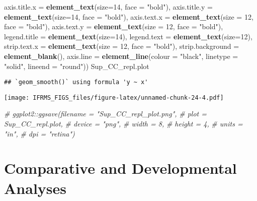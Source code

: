 \documentclass[
]{article}
\newenvironment{Shaded}{\begin{snugshade}}{\end{snugshade}}
\newcommand{\CommentTok}[1]{\textcolor[rgb]{0.56,0.35,0.01}{\textit{#1}}}
\newcommand{\DataTypeTok}[1]{\textcolor[rgb]{0.13,0.29,0.53}{#1}}
\newcommand{\DecValTok}[1]{\textcolor[rgb]{0.00,0.00,0.81}{#1}}
\newcommand{\KeywordTok}[1]{\textcolor[rgb]{0.13,0.29,0.53}{\textbf{#1}}}
\newcommand{\NormalTok}[1]{#1}
\newcommand{\StringTok}[1]{\textcolor[rgb]{0.31,0.60,0.02}{#1}}
\begin{document}
\begin{Shaded}
\begin{Highlighting}[]
        \DataTypeTok{axis.title.x =} \KeywordTok{element_text}\NormalTok{(}\DataTypeTok{size=}\DecValTok{14}\NormalTok{, }\DataTypeTok{face =} \StringTok{"bold"}\NormalTok{),}
        \DataTypeTok{axis.title.y =} \KeywordTok{element_text}\NormalTok{(}\DataTypeTok{size=}\DecValTok{14}\NormalTok{, }\DataTypeTok{face =} \StringTok{"bold"}\NormalTok{),}
        \DataTypeTok{axis.text.x =} \KeywordTok{element_text}\NormalTok{(}\DataTypeTok{size =} \DecValTok{12}\NormalTok{, }\DataTypeTok{face =} \StringTok{"bold"}\NormalTok{),}
        \DataTypeTok{axis.text.y =} \KeywordTok{element_text}\NormalTok{(}\DataTypeTok{size =} \DecValTok{12}\NormalTok{, }\DataTypeTok{face =} \StringTok{"bold"}\NormalTok{),}
        \DataTypeTok{legend.title =} \KeywordTok{element_text}\NormalTok{(}\DataTypeTok{size=}\DecValTok{14}\NormalTok{), }
        \DataTypeTok{legend.text =} \KeywordTok{element_text}\NormalTok{(}\DataTypeTok{size=}\DecValTok{12}\NormalTok{),}
        \DataTypeTok{strip.text.x =} \KeywordTok{element_text}\NormalTok{(}\DataTypeTok{size =} \DecValTok{12}\NormalTok{, }\DataTypeTok{face =} \StringTok{"bold"}\NormalTok{),}
        \DataTypeTok{strip.background =} \KeywordTok{element_blank}\NormalTok{(),}
        \DataTypeTok{axis.line =} \KeywordTok{element_line}\NormalTok{(}\DataTypeTok{colour =} \StringTok{"black"}\NormalTok{, }\DataTypeTok{linetype =} \StringTok{"solid"}\NormalTok{, }\DataTypeTok{lineend =} \StringTok{"round"}\NormalTok{)) }
\NormalTok{Sup_CC_repl.plot}
\end{Highlighting}
\end{Shaded}

\begin{verbatim}
## `geom_smooth()` using formula 'y ~ x'
\end{verbatim}

\texttt{[image: IFRMS\_FIGS\_files/figure-latex/unnamed-chunk-24-4.pdf]}

\begin{Shaded}
\begin{Highlighting}[]
\CommentTok{# ggplot2::ggsave(filename = "Sup_CC_repl_plot.png",}
\CommentTok{#                 plot = Sup_CC_repl.plot,}
\CommentTok{#                 device = "png",}
\CommentTok{#                 width = 8,}
\CommentTok{#                 height = 4, }
\CommentTok{#                 units = "in",}
\CommentTok{#                 dpi = "retina") }
\end{Highlighting}
\end{Shaded}

\hypertarget{comparative-and-developmental-analyses}{%
\section{Comparative and Developmental
Analyses}\label{comparative-and-developmental-analyses}}
\end{document}
